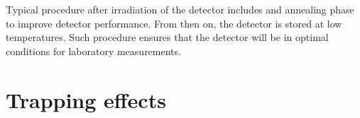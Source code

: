 Typical procedure after irradiation of the detector includes and annealing phase to improve detector performance. From then on, the detector is stored at low temperatures. Such procedure ensures that the detector will be in optimal conditions for laboratory measurements.


\section{Trapping effects} %
\label{sec:trapEfect}



